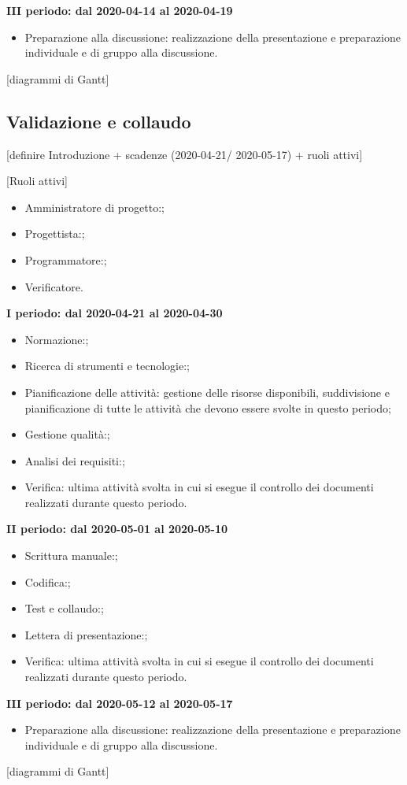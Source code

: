 \textbf{III periodo: dal 2020-04-14 al 2020-04-19}
\begin{itemize}
	\item Preparazione alla discussione: realizzazione della presentazione e preparazione individuale e di gruppo alla discussione.
\end{itemize}

[diagrammi di Gantt]

\subsection{Validazione e collaudo}
[definire Introduzione + scadenze (2020-04-21/	2020-05-17) + ruoli attivi]

[Ruoli attivi]
\begin{itemize}
	\item Amministratore di progetto:;
	\item Progettista:;
	\item Programmatore:;
	\item Verificatore.
\end{itemize}

\textbf{I periodo: dal 2020-04-21 al 2020-04-30}
\begin{itemize}
	\item Normazione:;
	\item Ricerca di strumenti e tecnologie:;
	\item Pianificazione delle attività: gestione delle risorse disponibili, suddivisione e pianificazione di tutte le attività che devono essere svolte in questo periodo;
	\item Gestione qualità:;
	\item Analisi dei requisiti:;
	\item Verifica: ultima attività svolta in cui si esegue il controllo dei documenti realizzati durante questo periodo.
\end{itemize}

\textbf{II periodo: dal 2020-05-01 al 2020-05-10}
\begin{itemize}
	\item Scrittura manuale:;
	\item Codifica:;
	\item Test e collaudo:;
	\item Lettera di presentazione:;
	\item Verifica: ultima attività svolta in cui si esegue il controllo dei documenti realizzati durante questo periodo.
\end{itemize}

\textbf{III periodo: dal 2020-05-12 al 2020-05-17}
\begin{itemize}
	\item Preparazione alla discussione: realizzazione della presentazione e preparazione individuale e di gruppo alla discussione.
\end{itemize}

[diagrammi di Gantt]



